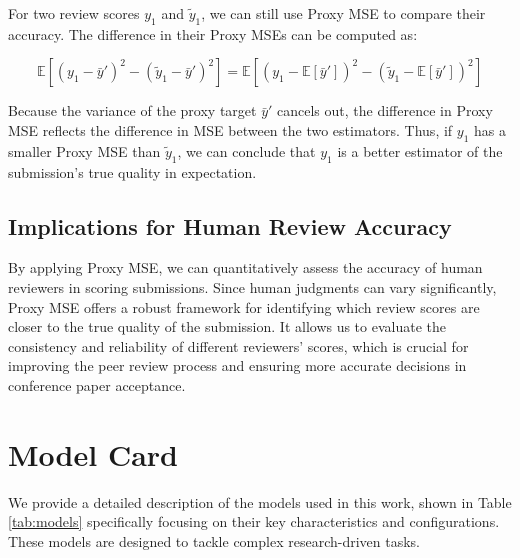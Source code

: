 \documentclass{article} %
\begin{document}
For two review scores $y_1$ and $\tilde{y}_1$, we can still use Proxy MSE to compare their accuracy. The difference in their Proxy MSEs can be computed as:

\begin{equation}
    \mathbb{E}[(y_1 - \bar{y}')^2 - (\tilde{y}_1 - \bar{y}')^2] = \mathbb{E}[(y_1 - \mathbb{E}[\bar{y}'])^2 - (\tilde{y}_1 - \mathbb{E}[\bar{y}'])^2]
\end{equation}

Because the variance of the proxy target $\bar{y}'$ cancels out, the difference in Proxy MSE reflects the difference in MSE between the two estimators. Thus, if $y_1$ has a smaller Proxy MSE than $\tilde{y}_1$, we can conclude that $y_1$ is a better estimator of the submission's true quality in expectation.

\subsection{Implications for Human Review Accuracy}

By applying Proxy MSE, we can quantitatively assess the accuracy of human reviewers in scoring submissions. Since human judgments can vary significantly, Proxy MSE offers a robust framework for identifying which review scores are closer to the true quality of the submission. It allows us to evaluate the consistency and reliability of different reviewers' scores, which is crucial for improving the peer review process and ensuring more accurate decisions in conference paper acceptance.

\section{Model Card}
\label{appendix:model}



We provide a detailed description of the models used in this work, shown in Table \ref{tab:models} specifically focusing on their key characteristics and configurations. These models are designed to tackle complex research-driven tasks.
\end{document}
